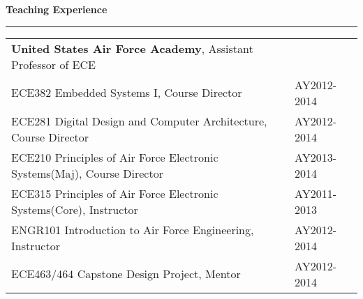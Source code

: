 \newpage

\large
\textbf{Teaching Experience}\\
\rule{\textwidth}{1pt}

\begin{table}[h!]
\centering
\small
\begin{tabular}{ p{12.5cm} p{4.5cm}}
	\textbf{United States Air Force Academy}, Assistant Professor of ECE& \\
ECE382 Embedded Systems I, Course Director& AY2012-2014\\
ECE281 Digital Design and Computer Architecture, Course Director & AY2012-2014\\
ECE210 Principles of Air Force Electronic Systems(Maj), Course Director & AY2013-2014\\
ECE315 Principles of Air Force Electronic Systems(Core), Instructor & AY2011-2013\\
ENGR101 Introduction to Air Force Engineering, Instructor & AY2012-2014\\
ECE463/464 Capstone Design Project, Mentor & AY2012-2014
\end{tabular}
\end{table}



